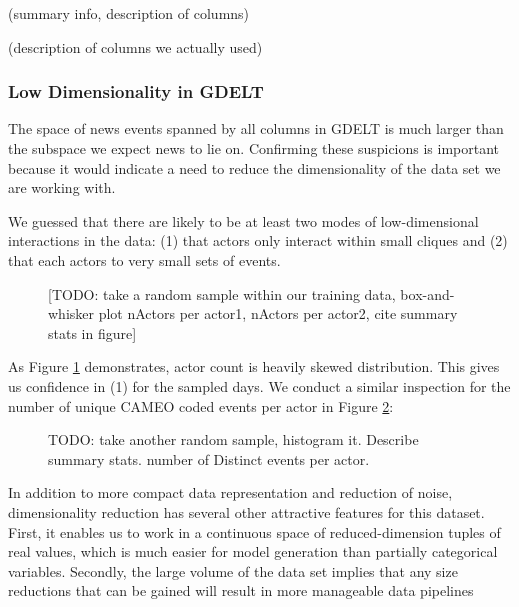
(summary info, description of columns)

(description of columns we actually used)

\subsubsection{Low Dimensionality in GDELT}

The space of news events spanned by all columns in GDELT is much larger than the subspace we expect news to lie on. Confirming these suspicions is important because it would indicate a need to reduce the dimensionality of the data set we are working with.

We guessed that there are likely to be at least two modes of low-dimensional interactions in the data: (1) that actors only interact within small cliques and (2) that each actors to very small sets of events.

\begin{figure}[h]
\centering
\caption{[TODO: take a random sample within our training data, box-and-whisker plot nActors per actor1, nActors per actor2, cite summary stats in figure]
\label{fig:actors-per-actor}}
\end{figure}

As Figure \ref{fig:actors-per-actor} demonstrates, actor count is heavily skewed distribution. This gives us confidence in (1) for the sampled days. We conduct a similar inspection for the number of unique CAMEO coded events per actor in Figure \ref{fig:events-per-actor}:

\begin{figure}[h]
\centering
\caption{TODO: take another random sample, histogram it. Describe summary stats. number of Distinct events per actor.
\label{fig:events-per-actor}}
\end{figure}

In addition to more compact data representation and reduction of noise, dimensionality reduction has several other attractive features for this dataset. First, it enables us to work in a continuous space of reduced-dimension tuples of real values, which is much easier for model generation than partially categorical variables. Secondly, the large volume of the data set implies that any size reductions that can be gained will result in more manageable data pipelines